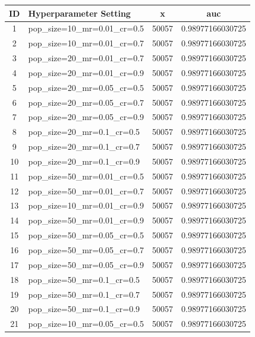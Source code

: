 \documentclass{article}
\begin{document}
\begin{table}[h!]
\centering
\begin{tabular}{|c|l|c|c|}
\hline
\textbf{ID} & \textbf{Hyperparameter Setting} & \textbf{x} & \textbf{auc} \\ \hline
1  & pop\_size=10\_mr=0.01\_cr=0.5 & 50057 & 0.98977166030725 \\ \hline
2  & pop\_size=10\_mr=0.01\_cr=0.7 & 50057 & 0.98977166030725 \\ \hline
3  & pop\_size=20\_mr=0.01\_cr=0.7 & 50057 & 0.98977166030725 \\ \hline
4  & pop\_size=20\_mr=0.01\_cr=0.9 & 50057 & 0.98977166030725 \\ \hline
5  & pop\_size=20\_mr=0.05\_cr=0.5 & 50057 & 0.98977166030725 \\ \hline
6  & pop\_size=20\_mr=0.05\_cr=0.7 & 50057 & 0.98977166030725 \\ \hline
7  & pop\_size=20\_mr=0.05\_cr=0.9 & 50057 & 0.98977166030725 \\ \hline
8  & pop\_size=20\_mr=0.1\_cr=0.5  & 50057 & 0.98977166030725 \\ \hline
9  & pop\_size=20\_mr=0.1\_cr=0.7  & 50057 & 0.98977166030725 \\ \hline
10 & pop\_size=20\_mr=0.1\_cr=0.9  & 50057 & 0.98977166030725 \\ \hline
11 & pop\_size=50\_mr=0.01\_cr=0.5 & 50057 & 0.98977166030725 \\ \hline
12 & pop\_size=50\_mr=0.01\_cr=0.7 & 50057 & 0.98977166030725 \\ \hline
13 & pop\_size=10\_mr=0.01\_cr=0.9 & 50057 & 0.98977166030725 \\ \hline
14 & pop\_size=50\_mr=0.01\_cr=0.9 & 50057 & 0.98977166030725 \\ \hline
15 & pop\_size=50\_mr=0.05\_cr=0.5 & 50057 & 0.98977166030725 \\ \hline
16 & pop\_size=50\_mr=0.05\_cr=0.7 & 50057 & 0.98977166030725 \\ \hline
17 & pop\_size=50\_mr=0.05\_cr=0.9 & 50057 & 0.98977166030725 \\ \hline
18 & pop\_size=50\_mr=0.1\_cr=0.5  & 50057 & 0.98977166030725 \\ \hline
19 & pop\_size=50\_mr=0.1\_cr=0.7  & 50057 & 0.98977166030725 \\ \hline
20 & pop\_size=50\_mr=0.1\_cr=0.9  & 50057 & 0.98977166030725 \\ \hline
21 & pop\_size=10\_mr=0.05\_cr=0.5 & 50057 & 0.98977166030725 \\ \hline

\end{tabular}
\end{table}
\end{document}
